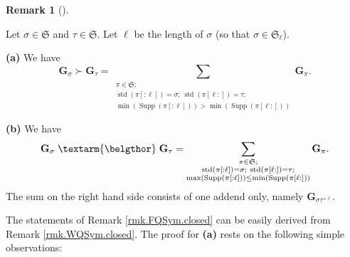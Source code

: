 \documentclass[numbers=enddot,12pt,final,onecolumn,notitlepage,abstracton]{scrartcl}%
\theoremstyle{definition}
\newtheorem{remk}[theo]{Remark}
\newenvironment{remark}[1][]
{\begin{remk}[#1]\begin{leftbar}}
{\end{leftbar}\end{remk}}
\newcommand{\bel}{\left. \textarm{\belgthor} \right.}
\let\sumnonlimits\sum
\renewcommand{\sum}{\sumnonlimits\limits}
\begin{document}
\begin{remark}
\label{rmk.FQSym.closed}Let $\sigma\in\mathfrak{S}$ and $\tau\in\mathfrak{S}$.
Let $\ell$ be the length of $\sigma$ (so that $\sigma\in\mathfrak{S}_{\ell}$).

\textbf{(a)} We have%
\[
\mathbf{G}_{\sigma}\left.  \succ\right.  \mathbf{G}_{\tau}=\sum_{\substack{\pi
\in\mathfrak{S};\\\operatorname*{std}\left(  \pi\left[  :\ell\right]  \right)
=\sigma;\ \operatorname*{std}\left(  \pi\left[  \ell:\right]  \right)
=\tau;\\\min\left(  \operatorname*{Supp}\left(  \pi\left[  :\ell\right]
\right)  \right)  >\min\left(  \operatorname*{Supp}\left(  \pi\left[
\ell:\right]  \right)  \right)  }}\mathbf{G}_{\pi}.
\]


\textbf{(b)} We have%
\[
\mathbf{G}_{\sigma} \bel \mathbf{G}_{\tau}=\sum_{\substack{\pi\in
\mathfrak{S};\\\operatorname*{std}\left(  \pi\left[  :\ell\right]  \right)
=\sigma;\ \operatorname*{std}\left(  \pi\left[  \ell:\right]  \right)
=\tau;\\\max\left(  \operatorname*{Supp}\left(  \pi\left[  :\ell\right]
\right)  \right)  \leq\min\left(  \operatorname*{Supp}\left(  \pi\left[
\ell:\right]  \right)  \right)  }}\mathbf{G}_{\pi}.
\]
The sum on the right hand side consists of one addend only, namely
$\mathbf{G}_{\sigma\tau^{+\ell}}$.
\end{remark}

The statements of Remark \ref{rmk.FQSym.closed} can be easily derived from
Remark \ref{rmk.WQSym.closed}. The proof for \textbf{(a)} rests on the
following simple observations:
\end{document}
